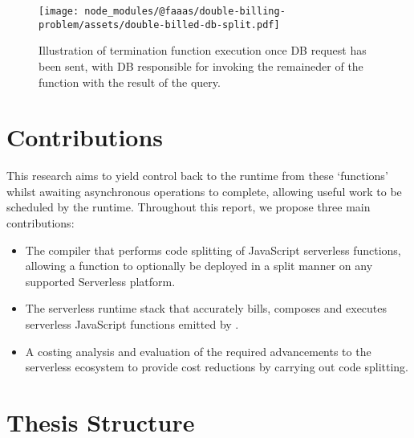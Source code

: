 \begin{figure}[t]
    \texttt{[image: node\_modules/@faaas/double-billing-problem/assets/double-billed-db-split.pdf]}
    \caption{Illustration of termination function execution once DB request has been sent, with DB responsible for invoking the remaineder of the function with the result of the query.}
    \label{fig:double-billing-db-split}
\end{figure}

\section{Contributions}

This research aims to yield control back to the runtime from these `functions' whilst awaiting asynchronous operations to complete, allowing useful work to be scheduled by the runtime. Throughout this report, we propose three main contributions:

\begin{itemize}
    \item The \faaasc{} compiler that performs code splitting of JavaScript serverless functions, allowing a function to optionally be deployed in a split manner on any supported Serverless\cite{serverlessServerlessZeroFrictionServerless2024} platform.

    \item The \faaastime{} serverless runtime stack that accurately bills, composes and executes serverless JavaScript functions emitted by \faaasc{}.

    \item A costing analysis and evaluation of the required advancements to the serverless ecosystem to provide cost reductions by carrying out code splitting.
\end{itemize}

\section{Thesis Structure}
